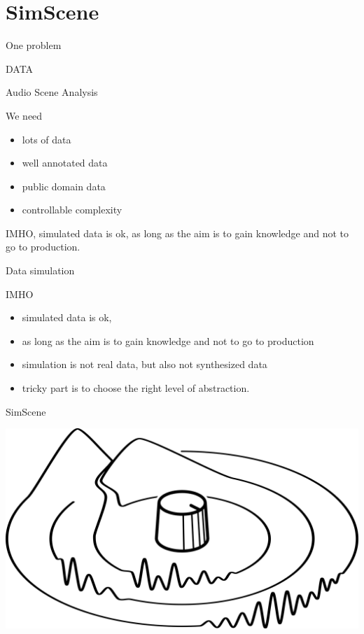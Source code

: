 \documentclass[compress]{beamer}
\begin{document}
\section{SimScene}

\begin{frame}{One problem}
\begin{center}
\huge DATA
\end{center}
\end{frame}


\begin{frame}{Audio Scene Analysis}
\begin{center}
\begin{block}{We need}
\begin{itemize}
\item lots of data
\item well annotated data
\item public domain data
\item controllable complexity
\end{itemize}
\end{block}
IMHO, simulated data is ok, as long as the aim is to gain knowledge and not to go to production.
\end{center}
\end{frame}

\begin{frame}{Data simulation}
\begin{center}
\begin{block}{IMHO}
\begin{itemize}
\item simulated data is ok, 
\item as long as the aim is to gain knowledge and not to go to production
\item simulation is not real data, but also not synthesized data
\item tricky part is to choose the right level of abstraction.
\end{itemize}
\end{block}
\end{center}
\end{frame}

\begin{frame}{SimScene}
\begin{center}
\includegraphics[width=.6\columnwidth]{figures/simscene} \\
\end{center}
\end{frame}
\end{document}
